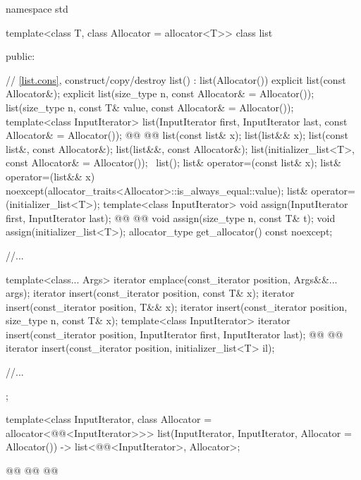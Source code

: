 \documentclass{wg21}
\begin{document}
\begin{codeblock}
namespace std {
    template<class T, class Allocator = allocator<T>>
    class list {
        public:
        
        // \ref{list.cons}, construct/copy/destroy
        list() : list(Allocator()) { }
        explicit list(const Allocator&);
        explicit list(size_type n, const Allocator& = Allocator());
        list(size_type n, const T& value, const Allocator& = Allocator());
        template<class InputIterator>
        list(InputIterator first, InputIterator last, const Allocator& = Allocator());
        @@
        @@
        list(const list& x);
        list(list&& x);
        list(const list&, const Allocator&);
        list(list&&, const Allocator&);
        list(initializer_list<T>, const Allocator& = Allocator());
        ~list();
        list& operator=(const list& x);
        list& operator=(list&& x)
        noexcept(allocator_traits<Allocator>::is_always_equal::value);
        list& operator=(initializer_list<T>);
        template<class InputIterator>
        void assign(InputIterator first, InputIterator last);
        @@
        @@
        void assign(size_type n, const T& t);
        void assign(initializer_list<T>);
        allocator_type get_allocator() const noexcept;
        
        //...
        
        template<class... Args> iterator emplace(const_iterator position, Args&&... args);
        iterator insert(const_iterator position, const T& x);
        iterator insert(const_iterator position, T&& x);
        iterator insert(const_iterator position, size_type n, const T& x);
        template<class InputIterator>
        iterator insert(const_iterator position, InputIterator first, InputIterator last);
        @@
        @@
        iterator insert(const_iterator position, initializer_list<T> il);
        
        //...
    };
    
    template<class InputIterator, class Allocator = allocator<@@<InputIterator>>>
    list(InputIterator, InputIterator, Allocator = Allocator())
    -> list<@@<InputIterator>, Allocator>;
    
    @@
    @@
    @@
}
\end{codeblock}
\end{document}
